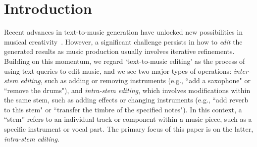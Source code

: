 \maketitle

\begin{abstract}
    Recent advances in text-to-music generation models have opened new avenues in musical creativity. However, music generation usually involves iterative refinements, and how to edit the generated music remains a significant challenge. This paper introduces a novel approach to the editing of music generated by such models, enabling the modification of specific attributes, such as genre, mood and instrument, while maintaining other aspects unchanged. Our method transforms text editing to \textit{latent space manipulation} while adding an extra constraint to enforce consistency. It seamlessly integrates with existing pretrained text-to-music diffusion models without requiring additional training. Experimental results demonstrate superior performance over both zero-shot and certain supervised baselines in style and timbre transfer evaluations. We also showcase the practical applicability of our approach in real-world music editing scenarios. 
\end{abstract}

\section{Introduction}

Recent advances in text-to-music generation have unlocked new possibilities in musical creativity~\cite{butter,accomontage,musecoco,polyffusion,musiclm,mousai,musicgen,musicldm}. However, a significant challenge persists in how to \textit{edit} the generated results as music production usually involves iterative refinements. Building on this momentum, we regard `text-to-music editing' as the process of using text queries to edit music, and we see two major types of operations: \textit{inter-stem editing}, such as adding or removing instruments (e.g., ``add a saxophone" or ``remove the drums"), and \textit{intra-stem editing}, which involves modifications within the same stem, such as adding effects or changing instruments (e.g., ``add reverb to this stem" or ``transfer the timbre of the specified notes"). In this context, a ``stem'' refers to an individual track or component within a music piece, such as a specific instrument or vocal part. The primary focus of this paper is on the latter, \textit{intra-stem editing}. 

